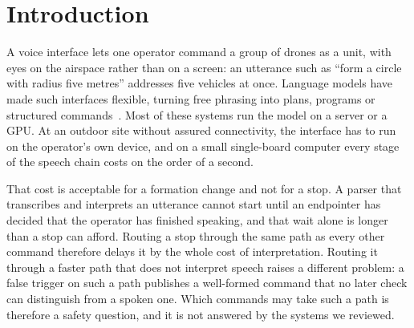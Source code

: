 \documentclass[a4paper,fleqn]{cas-dc}
\begin{document}
\section{Introduction}
\label{sec:intro}

A voice interface lets one operator command a group of drones as a unit, with eyes on the airspace
rather than on a screen: an utterance such as ``form a circle with radius five metres'' addresses
five vehicles at once. Language models have made such interfaces flexible, turning free phrasing into
plans, programs or structured commands~\citep{saycan2022,chatgptrobotics2024,typefly2024}. Most of
these systems run the model on a server or a GPU. At an outdoor site without assured connectivity,
the interface has to run on the operator's own device, and on a small single-board computer every
stage of the speech chain costs on the order of a second.

That cost is acceptable for a formation change and not for a stop. A parser that transcribes and
interprets an utterance cannot start until an endpointer has decided that the operator has
finished speaking, and that wait alone is longer than a stop can afford. Routing a stop through the
same path as every other command therefore delays it by the whole cost of interpretation. Routing it
through a faster path that does not interpret speech raises a different problem: a false trigger on
such a path publishes a well-formed command that no later check can distinguish from a spoken one.
Which commands may take such a path is therefore a safety question, and it is not answered by the
systems we reviewed.
\end{document}
